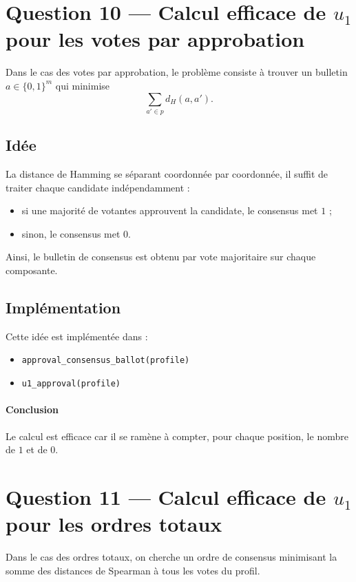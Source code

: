 \documentclass[11pt,a4paper]{article}
\begin{document}
\section{Question 10 --- Calcul efficace de \texorpdfstring{$u_1$}{u1} pour les votes par approbation}

Dans le cas des votes par approbation, le probl\`eme consiste \`a trouver un bulletin \(a \in \{0,1\}^m\) qui minimise
\[
\sum_{a' \in p} d_H(a,a').
\]

\subsection*{Id\'ee}

La distance de Hamming se s\'eparant coordonn\'ee par coordonn\'ee, il suffit de traiter chaque candidate ind\'ependamment :
\begin{itemize}[leftmargin=*]
    \item si une majorit\'e de votantes approuvent la candidate, le consensus met \(1\) ;
    \item sinon, le consensus met \(0\).
\end{itemize}

Ainsi, le bulletin de consensus est obtenu par vote majoritaire sur chaque composante.

\subsection*{Impl\'ementation}

Cette id\'ee est impl\'ement\'ee dans :
\begin{itemize}[leftmargin=*]
    \item \texttt{approval\_consensus\_ballot(profile)}
    \item \texttt{u1\_approval(profile)}
\end{itemize}

\paragraph{Conclusion}
Le calcul est efficace car il se ram\`ene \`a compter, pour chaque position, le nombre de \(1\) et de \(0\).

\section{Question 11 --- Calcul efficace de \texorpdfstring{$u_1$}{u1} pour les ordres totaux}

Dans le cas des ordres totaux, on cherche un ordre de consensus minimisant la somme des distances de Spearman \`a tous les votes du profil.
\end{document}
